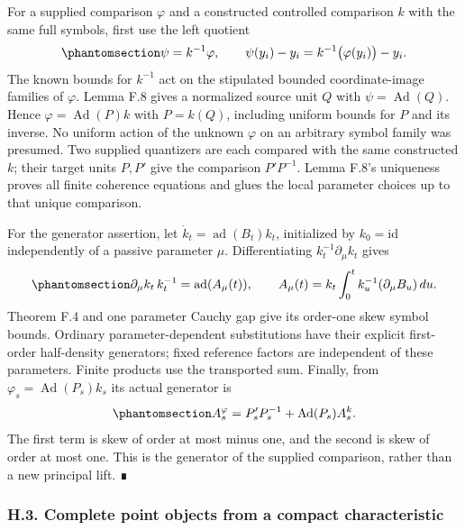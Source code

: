\documentclass[
  english,
  11pt,
  reqno]{amsart}
\begin{document}
For a supplied comparison \(\varphi\) and a constructed controlled
comparison \(k\) with the same full symbols, first use the left quotient
\begin{equation}\protect\phantomsection\label{eq:gg-qct-controlled-left-quotient}{
 \psi=k^{-1}\varphi,\qquad
 \psi(y_i)-y_i=k^{-1}\bigl(\varphi(y_i)\bigr)-y_i .
}\end{equation} The known bounds for \(k^{-1}\) act on the stipulated
bounded coordinate-image families of \(\varphi\). Lemma F.8 gives a
normalized source unit \(Q\) with \(\psi=\operatorname{Ad}(Q)\). Hence
\(\varphi=\operatorname{Ad}(P)k\) with \(P=k(Q)\), including uniform
bounds for \(P\) and its inverse. No uniform action of the unknown
\(\varphi\) on an arbitrary symbol family was presumed. Two supplied
quantizers are each compared with the same constructed \(k\); their
target units \(P,P'\) give the comparison \(P'P^{-1}\). Lemma F.8's
uniqueness proves all finite coherence equations and glues the local
parameter choices up to that unique comparison.

For the generator assertion, let \(\dot k_t=\operatorname{ad}(B_t)k_t\),
initialized by \(k_0=\mathrm{id}\) independently of a passive parameter
\(\mu\). Differentiating \(k_t^{-1}\partial_\mu k_t\) gives
\begin{equation}\protect\phantomsection\label{eq:gg-qct-passive-generator}{
 \partial_\mu k_t\,k_t^{-1}=\operatorname{ad}(A_\mu(t)),
 \qquad
 A_\mu(t)=k_t\int_0^t k_u^{-1}(\partial_\mu B_u)\,du .
}\end{equation} Theorem F.4 and one parameter Cauchy gap give its
order-one skew symbol bounds. Ordinary parameter-dependent substitutions
have their explicit first-order half-density generators; fixed reference
factors are independent of these parameters. Finite products use the
transported sum. Finally, from \(\varphi_s=\operatorname{Ad}(P_s)k_s\)
its actual generator is
\begin{equation}\protect\phantomsection\label{eq:gg-qct-given-generator}{
 A_s^\varphi=P_s'P_s^{-1}
                  +\operatorname{Ad}(P_s)A_s^k .
}\end{equation} The first term is skew of order at most minus one, and
the second is skew of order at most one. This is the generator of the
supplied comparison, rather than a new principal lift. ∎

\protect{}\label{sec:gg-independent-module-points}

\subsubsection{H.3. Complete point objects from a compact
characteristic}\label{h.3.-complete-point-objects-from-a-compact-characteristic}
\end{document}
